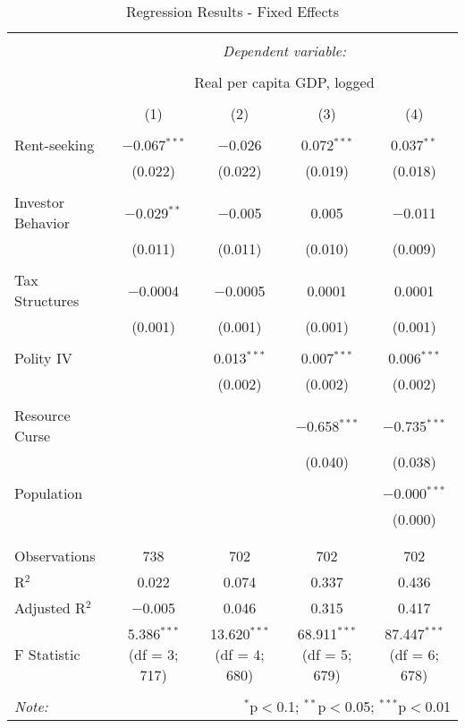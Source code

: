 \documentclass[12pt]{report}   	%
\begin{document}
\begin{landscape}
\begin{table}[h] \centering 
  \caption{Regression Results - Fixed Effects} 
  \label{} 
\begin{tabular}{@{\extracolsep{5pt}}lcccc} 
\\[-1.8ex]\hline 
\hline \\[-1.8ex] 
 & \multicolumn{4}{c}{\textit{Dependent variable:}} \\ 
\cline{2-5} 
\\[-1.8ex] & \multicolumn{4}{c}{Real per capita GDP, logged} \\ 
\\[-1.8ex] & (1) & (2) & (3) & (4)\\ 
\hline \\[-1.8ex] 
 Rent-seeking & $-$0.067$^{***}$ & $-$0.026 & 0.072$^{***}$ & 0.037$^{**}$ \\ 
  & (0.022) & (0.022) & (0.019) & (0.018) \\ 
  & & & & \\ 
 Investor Behavior & $-$0.029$^{**}$ & $-$0.005 & 0.005 & $-$0.011 \\ 
  & (0.011) & (0.011) & (0.010) & (0.009) \\ 
  & & & & \\ 
 Tax Structures & $-$0.0004 & $-$0.0005 & 0.0001 & 0.0001 \\ 
  & (0.001) & (0.001) & (0.001) & (0.001) \\ 
  & & & & \\ 
 Polity IV &  & 0.013$^{***}$ & 0.007$^{***}$ & 0.006$^{***}$ \\ 
  &  & (0.002) & (0.002) & (0.002) \\ 
  & & & & \\ 
 Resource Curse &  &  & $-$0.658$^{***}$ & $-$0.735$^{***}$ \\ 
  &  &  & (0.040) & (0.038) \\ 
  & & & & \\ 
 Population &  &  &  & $-$0.000$^{***}$ \\ 
  &  &  &  & (0.000) \\ 
  & & & & \\ 
\hline \\[-1.8ex] 
Observations & 738 & 702 & 702 & 702 \\ 
R$^{2}$ & 0.022 & 0.074 & 0.337 & 0.436 \\ 
Adjusted R$^{2}$ & $-$0.005 & 0.046 & 0.315 & 0.417 \\ 
F Statistic & 5.386$^{***}$ (df = 3; 717) & 13.620$^{***}$ (df = 4; 680) & 68.911$^{***}$ (df = 5; 679) & 87.447$^{***}$ (df = 6; 678) \\ 
\hline 
\hline \\[-1.8ex] 
\textit{Note:}  & \multicolumn{4}{r}{$^{*}$p$<$0.1; $^{**}$p$<$0.05; $^{***}$p$<$0.01} \\ 
\end{tabular} 
\end{table} 
\end{landscape}
\end{document}
